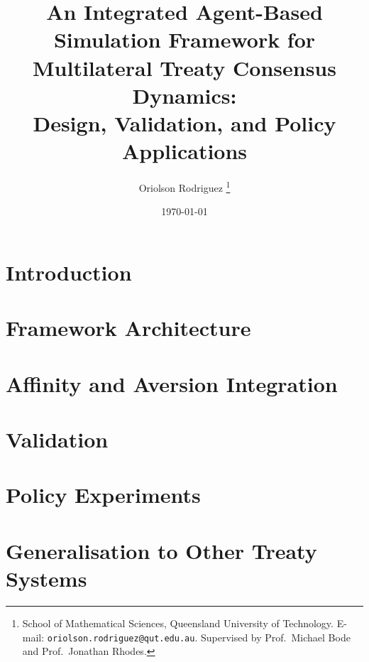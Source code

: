 \documentclass[12pt,a4paper]{article}
\title{An Integrated Agent-Based Simulation Framework for\\
       Multilateral Treaty Consensus Dynamics:\\
       Design, Validation, and Policy Applications}
\author{Oriolson Rodriguez%
  \thanks{School of Mathematical Sciences, Queensland University of Technology.
          E-mail: \texttt{oriolson.rodriguez@qut.edu.au}.
          Supervised by Prof.\ Michael Bode and Prof.\ Jonathan Rhodes.}}
\date{\today}
\theoremstyle{plain}
\theoremstyle{definition}
\begin{document}
\maketitle

\begin{abstract}
\end{abstract}

\section{Introduction}
\label{sec:intro}


\section{Framework Architecture}
\label{sec:architecture}


\section{Affinity and Aversion Integration}
\label{sec:integration}


\section{Validation}
\label{sec:validation}


\section{Policy Experiments}
\label{sec:experiments}


\section{Generalisation to Other Treaty Systems}
\label{sec:generalisation}
\end{document}
